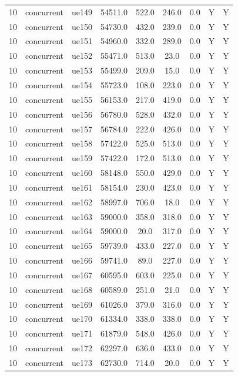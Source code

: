 \begin{table}[ht]
\begin{tabular}{|c|c|c|c|c|c|c|c|c|}
10 & concurrent & ue149 & 54511.0 & 522.0 & 246.0 & 0.0 & Y & Y \\
10 & concurrent & ue150 & 54730.0 & 432.0 & 239.0 & 0.0 & Y & Y \\
10 & concurrent & ue151 & 54960.0 & 332.0 & 289.0 & 0.0 & Y & Y \\
10 & concurrent & ue152 & 55471.0 & 513.0 & 23.0 & 0.0 & Y & Y \\
10 & concurrent & ue153 & 55499.0 & 209.0 & 15.0 & 0.0 & Y & Y \\
10 & concurrent & ue154 & 55723.0 & 108.0 & 223.0 & 0.0 & Y & Y \\
10 & concurrent & ue155 & 56153.0 & 217.0 & 419.0 & 0.0 & Y & Y \\
10 & concurrent & ue156 & 56780.0 & 528.0 & 432.0 & 0.0 & Y & Y \\
10 & concurrent & ue157 & 56784.0 & 222.0 & 426.0 & 0.0 & Y & Y \\
10 & concurrent & ue158 & 57422.0 & 525.0 & 513.0 & 0.0 & Y & Y \\
10 & concurrent & ue159 & 57422.0 & 172.0 & 513.0 & 0.0 & Y & Y \\
10 & concurrent & ue160 & 58148.0 & 550.0 & 429.0 & 0.0 & Y & Y \\
10 & concurrent & ue161 & 58154.0 & 230.0 & 423.0 & 0.0 & Y & Y \\
10 & concurrent & ue162 & 58997.0 & 706.0 & 18.0 & 0.0 & Y & Y \\
10 & concurrent & ue163 & 59000.0 & 358.0 & 318.0 & 0.0 & Y & Y \\
10 & concurrent & ue164 & 59000.0 & 20.0 & 317.0 & 0.0 & Y & Y \\
10 & concurrent & ue165 & 59739.0 & 433.0 & 227.0 & 0.0 & Y & Y \\
10 & concurrent & ue166 & 59741.0 & 89.0 & 227.0 & 0.0 & Y & Y \\
10 & concurrent & ue167 & 60595.0 & 603.0 & 225.0 & 0.0 & Y & Y \\
10 & concurrent & ue168 & 60589.0 & 251.0 & 21.0 & 0.0 & Y & Y \\
10 & concurrent & ue169 & 61026.0 & 379.0 & 316.0 & 0.0 & Y & Y \\
10 & concurrent & ue170 & 61334.0 & 338.0 & 338.0 & 0.0 & Y & Y \\
10 & concurrent & ue171 & 61879.0 & 548.0 & 426.0 & 0.0 & Y & Y \\
10 & concurrent & ue172 & 62297.0 & 636.0 & 433.0 & 0.0 & Y & Y \\
10 & concurrent & ue173 & 62730.0 & 714.0 & 20.0 & 0.0 & Y & Y \\

\end{tabular}
\end{table}
